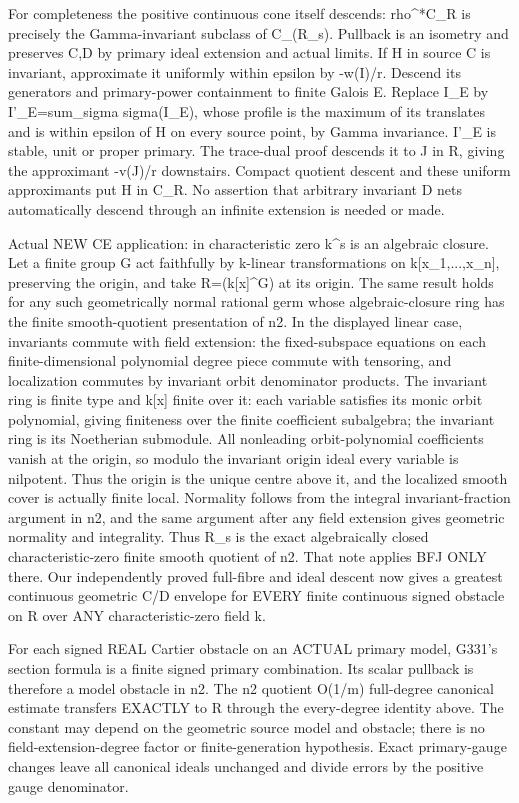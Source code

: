 For completeness the positive continuous cone itself descends: rho\textasciicircum{}*C\_R is precisely the Gamma-invariant subclass of C\_(R\_s). Pullback is an isometry and preserves C,D by primary ideal extension and actual limits. If H in source C is invariant, approximate it uniformly within epsilon by -w(I)/r. Descend its generators and primary-power containment to finite Galois E. Replace I\_E by I'\_E=sum\_sigma sigma(I\_E), whose profile is the maximum of its translates and is within epsilon of H on every source point, by Gamma invariance. I'\_E is stable, unit or proper primary. The trace-dual proof descends it to J in R, giving the approximant -v(J)/r downstairs. Compact quotient descent and these uniform approximants put H in C\_R. No assertion that arbitrary invariant D nets automatically descend through an infinite extension is needed or made.

Actual NEW CE application: in characteristic zero k\textasciicircum{}s is an algebraic closure. Let a finite group G act faithfully by k-linear transformations on k[x\_1,...,x\_n], preserving the origin, and take R=(k[x]\textasciicircum{}G) at its origin. The same result holds for any such geometrically normal rational germ whose algebraic-closure ring has the finite smooth-quotient presentation of n2. In the displayed linear case, invariants commute with field extension: the fixed-subspace equations on each finite-dimensional polynomial degree piece commute with tensoring, and localization commutes by invariant orbit denominator products. The invariant ring is finite type and k[x] finite over it: each variable satisfies its monic orbit polynomial, giving finiteness over the finite coefficient subalgebra; the invariant ring is its Noetherian submodule. All nonleading orbit-polynomial coefficients vanish at the origin, so modulo the invariant origin ideal every variable is nilpotent. Thus the origin is the unique centre above it, and the localized smooth cover is actually finite local. Normality follows from the integral invariant-fraction argument in n2, and the same argument after any field extension gives geometric normality and integrality. Thus R\_s is the exact algebraically closed characteristic-zero finite smooth quotient of n2. That note applies BFJ ONLY there. Our independently proved full-fibre and ideal descent now gives a greatest continuous geometric C/D envelope for EVERY finite continuous signed obstacle on R over ANY characteristic-zero field k.

For each signed REAL Cartier obstacle on an ACTUAL primary model, G331's section formula is a finite signed primary combination. Its scalar pullback is therefore a model obstacle in n2. The n2 quotient O(1/m) full-degree canonical estimate transfers EXACTLY to R through the every-degree identity above. The constant may depend on the geometric source model and obstacle; there is no field-extension-degree factor or finite-generation hypothesis. Exact primary-gauge changes leave all canonical ideals unchanged and divide errors by the positive gauge denominator.

